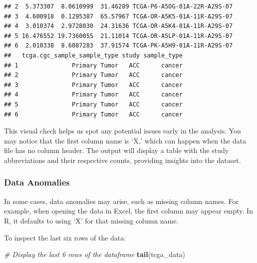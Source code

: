 \documentclass[
]{book}
\newenvironment{Shaded}{\begin{snugshade}}{\end{snugshade}}
\newcommand{\CommentTok}[1]{\textcolor[rgb]{0.56,0.35,0.01}{\textit{#1}}}
\newcommand{\FunctionTok}[1]{\textcolor[rgb]{0.13,0.29,0.53}{\textbf{#1}}}
\newcommand{\NormalTok}[1]{#1}
\begin{document}
\begin{verbatim}
## 2  5.373307  8.0610999  31.46289 TCGA-P6-A5OG-01A-22R-A29S-07
## 3  4.600918  0.1295387  65.57967 TCGA-OR-A5K5-01A-11R-A29S-07
## 4  3.010374  2.9728030  24.31636 TCGA-OR-A5K4-01A-11R-A29S-07
## 5 16.476552 19.7360055  21.11014 TCGA-OR-A5LP-01A-11R-A29S-07
## 6  2.010338  8.6087283  37.91574 TCGA-PK-A5H9-01A-11R-A29S-07
##   tcga.cgc_sample_sample_type study sample_type
## 1               Primary Tumor   ACC      cancer
## 2               Primary Tumor   ACC      cancer
## 3               Primary Tumor   ACC      cancer
## 4               Primary Tumor   ACC      cancer
## 5               Primary Tumor   ACC      cancer
## 6               Primary Tumor   ACC      cancer
\end{verbatim}

This visual check helps us spot any potential issues early in the analysis. You may notice that the first column name is `X,' which can happen when the data file has no column header.
The output will display a table with the study abbreviations and their respective counts, providing insights into the dataset.

\hypertarget{data-anomalies}{%
\subsubsection{Data Anomalies}\label{data-anomalies}}

In some cases, data anomalies may arise, such as missing column names. For example, when opening the data in Excel, the first column may appear empty. In R, it defaults to using `X' for that missing column name.

To inspect the last six rows of the data:

\begin{Shaded}
\begin{Highlighting}[]
\CommentTok{\# Display the last 6 rows of the dataframe}
\FunctionTok{tail}\NormalTok{(tcga\_data)}
\end{Highlighting}
\end{Shaded}
\end{document}
